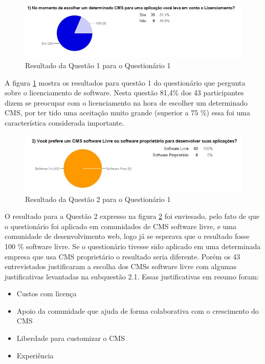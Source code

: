 \begin{figure}[h]
\centering
\includegraphics[keepaspectratio=true,scale=0.8]{figuras/Ques_1/q1.jpg}
\caption{Resultado da Questão 1 para o Questionário 1}
\label{Q1_Q1}
\end{figure}

A figura \ref{Q1_Q1} mostra os resultados para questão 1 do questionário que pergunta sobre o licenciamento de software. Nesta questão 81,4\% dos 43 participantes dizem se preocupar com o licenciamento na hora de escolher um determinado CMS, por ter tido uma aceitação muito grande (superior a 75 \%) essa foi uma característica considerada importante.

\begin{figure}[h]
\centering
\includegraphics[keepaspectratio=true,scale=0.8]{figuras/Ques_1/q2.jpg}
\caption{Resultado da Questão 2 para o Questionário 1}
\label{Q2_Q2}
\end{figure}

O resultado para a  Questão 2 expresso na figura \ref{Q2_Q2} foi enviesado, pelo fato de que o questionário foi aplicado em comunidades de CMS software livre, e uma comunidade de desenvolvimento web, logo já se esperava que o resultado fosse 100 \% software livre. Se o questionário tivesse sido aplicado em uma determinada empresa que usa CMS proprietário o resultado seria diferente. Porém os 43 entrevistados justificaram a escolha dos CMSs software livre com algumas justificativas levantadas na subquestão 2.1. Essas justificativas em resumo foram:
\begin{itemize}
\item Custos com licença
\item Apoio da comunidade que ajuda de forma colaborativa com o crescimento do CMS
\item Liberdade para customizar o CMS
\item Experiência
\end{itemize}

